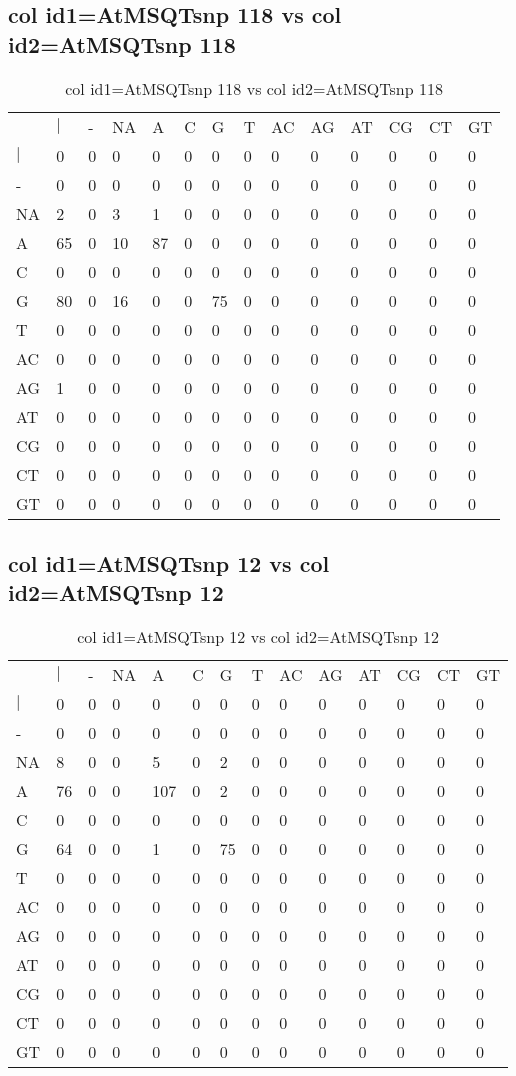 \subsection{col id1=AtMSQTsnp 118 vs col id2=AtMSQTsnp 118}
\begin{center}
\begin{longtable}{|l|l|l|l|l|l|l|l|l|l|l|l|l|l|}
\caption{col id1=AtMSQTsnp 118 vs col id2=AtMSQTsnp 118} \label{table_dm696}\\
\hline
\\
\hline
&$|$&-&NA&A&C&G&T&AC&AG&AT&CG&CT&GT\\
$|$&0&0&0&0&0&0&0&0&0&0&0&0&0\\
-&0&0&0&0&0&0&0&0&0&0&0&0&0\\
NA&2&0&3&1&0&0&0&0&0&0&0&0&0\\
A&65&0&10&87&0&0&0&0&0&0&0&0&0\\
C&0&0&0&0&0&0&0&0&0&0&0&0&0\\
G&80&0&16&0&0&75&0&0&0&0&0&0&0\\
T&0&0&0&0&0&0&0&0&0&0&0&0&0\\
AC&0&0&0&0&0&0&0&0&0&0&0&0&0\\
AG&1&0&0&0&0&0&0&0&0&0&0&0&0\\
AT&0&0&0&0&0&0&0&0&0&0&0&0&0\\
CG&0&0&0&0&0&0&0&0&0&0&0&0&0\\
CT&0&0&0&0&0&0&0&0&0&0&0&0&0\\
GT&0&0&0&0&0&0&0&0&0&0&0&0&0\\
\hline
\end{longtable}
\end{center}

\subsection{col id1=AtMSQTsnp 12 vs col id2=AtMSQTsnp 12}
\begin{center}
\begin{longtable}{|l|l|l|l|l|l|l|l|l|l|l|l|l|l|}
\caption{col id1=AtMSQTsnp 12 vs col id2=AtMSQTsnp 12} \label{table_dm698}\\
\hline
\\
\hline
&$|$&-&NA&A&C&G&T&AC&AG&AT&CG&CT&GT\\
$|$&0&0&0&0&0&0&0&0&0&0&0&0&0\\
-&0&0&0&0&0&0&0&0&0&0&0&0&0\\
NA&8&0&0&5&0&2&0&0&0&0&0&0&0\\
A&76&0&0&107&0&2&0&0&0&0&0&0&0\\
C&0&0&0&0&0&0&0&0&0&0&0&0&0\\
G&64&0&0&1&0&75&0&0&0&0&0&0&0\\
T&0&0&0&0&0&0&0&0&0&0&0&0&0\\
AC&0&0&0&0&0&0&0&0&0&0&0&0&0\\
AG&0&0&0&0&0&0&0&0&0&0&0&0&0\\
AT&0&0&0&0&0&0&0&0&0&0&0&0&0\\
CG&0&0&0&0&0&0&0&0&0&0&0&0&0\\
CT&0&0&0&0&0&0&0&0&0&0&0&0&0\\
GT&0&0&0&0&0&0&0&0&0&0&0&0&0\\
\hline
\end{longtable}
\end{center}

